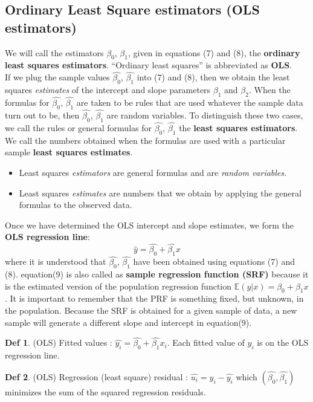 \documentclass[a4paper, 10pt]{article}
\theoremstyle{definition}	%
\newtheorem*{definition}{Def}
\begin{document}
\subsection{Ordinary Least Square estimators (OLS estimators)}
We will call the estimators $\beta_0$, $\beta_1$, given in equations (7) and (8), the \textbf{ordinary least squares estimators}. “Ordinary least squares” is abbreviated as \textbf{OLS}.\\
\indent If we plug the sample values $\hat{\beta_0}$, $\hat{\beta_1}$ into (7) and (8), then we obtain the least squares \textit{estimates} of the intercept and slope parameters $\beta_1$ and $\beta_2$. When the formulas for $\hat{\beta_0}$, $\hat{\beta_1}$ are taken to be rules that are used whatever the sample data turn out to be, then $\hat{\beta_0}$, $\hat{\beta_1}$ are random variables. To distinguish these two cases, we call the rules or general formulas for $\hat{\beta_0}$, $\hat{\beta_1}$ the \textbf{least squares estimators}. We call the numbers obtained when the formulas are used with a particular sample \textbf{least squares estimates}.
\begin{itemize}
    \item Least squares \textit{estimators} are general formulas and are \textit{random variables}. 
    \item Least squares \textit{estimates} are numbers that we obtain by applying the general formulas to the observed data.
\end{itemize}
Once we have determined the OLS intercept and slope estimates, we form the \textbf{OLS regression line}:
\begin{equation}
    \hat{y} = \hat{\beta_0} + \hat{\beta_1}x
\end{equation}
where it is understood that $\hat{\beta_0}$, $\hat{\beta_1}$ have been obtained using equations (7) and (8). equation(9) is also called as \textbf{sample regression function (SRF)} because it is the estimated version of the population regression function $\mathbb{E}(y|x) = \beta_0 + \beta_1 x$. It is important to remember that the PRF is something fixed, but unknown, in the population. Because the SRF is obtained for a given sample of data, a new sample will generate a different slope and intercept in equation(9).
\begin{definition}
    (OLS) Fitted values : $\hat{y_i} = \hat{\beta_0} + \hat{\beta_1}x_i$. Each fitted value of $y_i$ is on the OLS regression line. 
\end{definition}
\begin{definition}
    (OLS) Regression (least square) residual : $\hat{u_i} = y_i - \hat{y_i}$ which $(\hat{\beta_0}, \hat{\beta_1})$ minimizes the sum of the squared regression residuals.
\end{definition}
\end{document}
